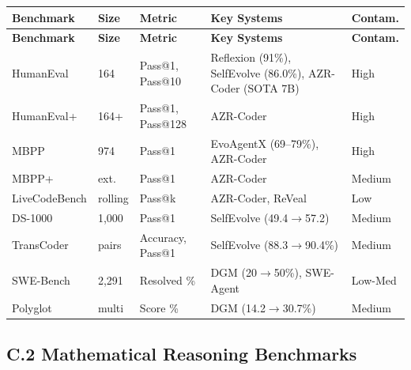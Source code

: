 \begin{longtable}{p{22mm}p{8mm}p{18mm}p{28mm}p{14mm}}
\toprule
\textbf{Benchmark} & \textbf{Size} & \textbf{Metric} & \textbf{Key Systems} & \textbf{Contam.} \\
\midrule
\endfirsthead
\toprule
\textbf{Benchmark} & \textbf{Size} & \textbf{Metric} & \textbf{Key Systems} & \textbf{Contam.} \\
\midrule
\endhead

HumanEval & 164 & Pass@1, Pass@10 & Reflexion (91\%), SelfEvolve (86.0\%), AZR-Coder (SOTA 7B) & High \\
HumanEval+ & 164+ & Pass@1, Pass@128 & AZR-Coder & High \\
MBPP & 974 & Pass@1 & EvoAgentX (69--79\%), AZR-Coder & High \\
MBPP+ & ext. & Pass@1 & AZR-Coder & Medium \\
LiveCodeBench & rolling & Pass@k & AZR-Coder, ReVeal & Low \\
DS-1000 & 1,000 & Pass@1 & SelfEvolve (49.4$\to$57.2) & Medium \\
TransCoder & pairs & Accuracy, Pass@1 & SelfEvolve (88.3$\to$90.4\%) & Medium \\
SWE-Bench & 2,291 & Resolved \% & DGM (20$\to$50\%), SWE-Agent & Low-Med \\
Polyglot & multi & Score \% & DGM (14.2$\to$30.7\%) & Medium \\
\bottomrule
\end{longtable}

\subsection*{C.2 Mathematical Reasoning Benchmarks}

